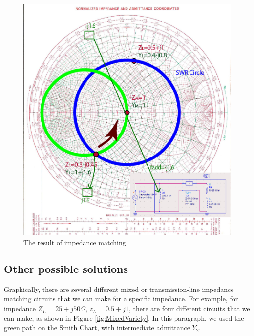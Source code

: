 \documentclass{ximera}
\begin{document}
\begin{figure}[htbp]
\begin{center}
\includegraphics[scale=1]{../jpg/MixedMatch5-01.jpg}
\end{center}
\caption{The result of impedance matching.}
\label{impmatchgen}
\end{figure}
\newpage

\subsection{Other possible solutions}

Graphically, there are several different mixed or transmission-line impedance matching circuits that we can make for a specific impedance. For example, for impedance $Z_L=25+j50 \Omega$, $z_L=0.5+j1$, there are four different circuits that we can make, as shown in Figure \ref{fig:MixedVariety}. In this paragraph, we used the green path on the Smith Chart, with intermediate admittance $Y_2$. 
\end{document}
